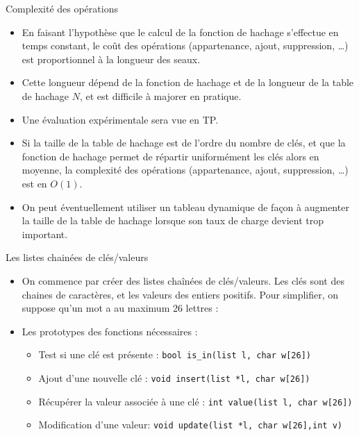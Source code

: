 \documentclass[10pt]{beamer}
\begin{document}
\begin{frame}{\Ctitle}{\stitle}
	\begin{block}{Complexité des opérations}
		\begin{itemize}
			\item<1-> En faisant l'hypothèse que le calcul de la fonction de hachage s'effectue en temps constant, le coût des opérations (appartenance, ajout, suppression, \dots) est proportionnel à la longueur des seaux.
			\item<2-> Cette longueur dépend de la fonction de hachage et de la longueur de la table de hachage $N$, et est difficile à majorer en pratique.
			\item<3-> Une évaluation expérimentale sera vue en TP.
			\item<4-> Si la taille de la table de hachage est de l'ordre du nombre de clés, et que la fonction de hachage permet de répartir uniformément les clés  alors en moyenne, la complexité des opérations (appartenance, ajout, suppression, \dots) est en $O(1)$.
			\item<5-> On peut éventuellement utiliser un tableau dynamique de façon à augmenter la taille de la table de hachage lorsque son taux de charge devient trop important.	
		\end{itemize}
	\end{block}
\end{frame}


\begin{frame}{\Ctitle}{\stitle}
	\begin{block}{Les listes chainées de clés/valeurs}
		\begin{itemize}
			\item<1-> On commence par créer des listes chaînées de clés/valeurs. Les clés sont des chaines de caractères, et les valeurs des entiers positifs. Pour simplifier, on suppose qu'un mot a au maximum 26 lettres :
				\onslide<2->{\inputpartC{\SPATH/count.c}{}{\scriptsize}{9}{16}}
			\item<3-> Les prototypes des fonctions nécessaires :
				\begin{itemize}
					\item<4-> Test si une clé est présente : \texttt{bool is_in(list l, char w[26])}
					\item<5-> Ajout d'une nouvelle clé : \texttt{void insert(list *l, char w[26])}
					\item<6-> Récupérer la valeur associée à une clé : \texttt{int value(list l, char w[26])}
					\item<7-> Modification d'une valeur: \texttt{void update(list *l, char w[26],int v)}
				\end{itemize}
		\end{itemize}
	\end{block}
\end{frame}
\end{document}
